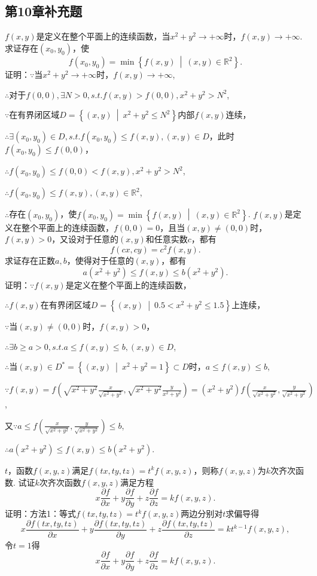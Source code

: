 \documentclass[12pt,UTF8]{ctexart}
\newcommand\Set[2]{\left\{#1\ \middle\vert\ #2 \right\}}
\begin{document}
\subsection{第10章补充题}
\begin{enumerate}
$f(x,y)$是定义在整个平面上的连续函数，当$x^2+y^2\rightarrow+\infty$时，$f(x,y)\rightarrow+\infty$. 求证存在$(x_0,y_0)$，使
\[
f(x_0,y_0)=\min\Set{f(x,y)}{(x,y)\in\mathbb R^2}.
\]
证明：$\because$当$x^2+y^2\rightarrow+\infty$时，$f(x,y)\rightarrow+\infty$,

$\therefore$对于$f(0,0),\exists N>0,s.t.f(x,y)>f(0,0),x^2+y^2>N^2$,

$\because$在有界闭区域$D=\Set{(x,y)}{x^2+y^2\leq N^2}$内部$f(x,y)$连续，

$\therefore\exists(x_0,y_0)\in D,s.t.f(x_0,y_0)\leq f(x,y),(x,y)\in D$，此时$f(x_0,y_0)\leq f(0,0)$，

$\therefore f(x_0,y_0)\leq f(0,0)<f(x,y),x^2+y^2>N^2$,

$\therefore f(x_0,y_0)\leq f(x,y),(x,y)\in\mathbb R^2$,

$\therefore$存在$(x_0,y_0)$，使$f(x_0,y_0)=\min\Set{f(x,y)}{(x,y)\in\mathbb R^2}$.
$f(x,y)$是定义在整个平面上的连续函数，$f(0,0)=0$，且当$(x,y)\neq(0,0)$时，$f(x,y)>0$，又设对于任意的$(x,y)$和任意实数$c$，都有
\[
f(cx,cy)=c^2f(x,y).
\]
求证存在正数$a,b$，使得对于任意的$(x,y)$，都有
\[
a(x^2+y^2)\leq f(x,y)\leq b(x^2+y^2).
\]
证明：$\because f(x,y)$是定义在整个平面上的连续函数，

$\therefore f(x,y)$在有界闭区域$D=\Set{(x,y)}{0.5<x^2+y^2\leq 1.5}$上连续，

$\because$当$(x,y)\neq(0,0)$时，$f(x,y)>0$，

$\therefore\exists b\geq a>0,s.t.a\leq f(x,y)\leq b,(x,y)\in D$,

$\therefore$当$(x,y)\in D^*=\Set{(x,y)}{x^2+y^2=1}\subset D$时，$a\leq f(x,y)\leq b$,

$\because f(x,y)=f(\sqrt{x^2+y^2}\frac x{\sqrt{x^2+y^2}},\sqrt{x^2+y^2}\frac y{x^2+y^2})=(x^2+y^2)f(\frac x{\sqrt{x^2+y^2}},\frac y{\sqrt{x^2+y^2}})$,

又$\because a\leq f(\frac x{\sqrt{x^2+y^2}},\frac y{\sqrt{x^2+y^2}})\leq b$,

$\therefore a(x^2+y^2)\leq f(x,y)\leq b(x^2+y^2)$.

$t$，函数$f(x,y,z)$满足$f(tx,ty,tz)=t^kf(x,y,z)$，则称$f(x,y,z)$为$k$次齐次函数. 试证$k$次齐次函数$f(x,y,z)$满足方程
\[
x\frac{\partial f}{\partial x}+y\frac{\partial f}{\partial y}+z\frac{\partial f}{\partial z}=kf(x,y,z).
\]
证明：方法1：等式$f(tx,ty,tz)=t^kf(x,y,z)$两边分别对$t$求偏导\footnotemark{}得
\[
x\frac{\partial f(tx,ty,tz)}{\partial x}+y\frac{\partial f(tx,ty,tz)}{\partial y}+z\frac{\partial f(tx,ty,tz)}{\partial z}=kt^{k-1}f(x,y,z),
\]
令$t=1$得
\[
x\frac{\partial f}{\partial x}+y\frac{\partial f}{\partial y}+z\frac{\partial f}{\partial z}=kf(x,y,z).
\]


\end{enumerate}
\end{document}
